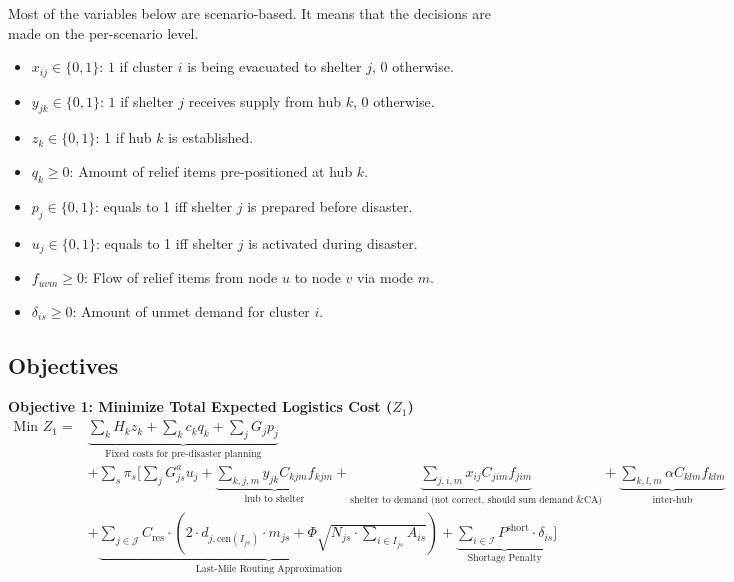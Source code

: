 {Most of the variables below are scenario-based. It means that the decisions are made on the per-scenario level.

\begin{itemize}
    \item $x_{ij} \in \{0,1\}$: $1$ if cluster $i$ is being evacuated to shelter $j$, $0$ otherwise.
    \item $y_{jk} \in \{0,1\}$: $1$ if shelter $j$ receives supply from hub $k$, $0$ otherwise.
    \item $z_k \in \{0,1\}$: 1 if hub $k$ is established.
    \item $q_k \ge 0$: Amount of relief items pre-positioned at hub $k$.
    \item $p_{j} \in \{0,1\}$: equals to 1 iff shelter $j$ is prepared before disaster.
    \item $u_{j} \in \{0,1\}$: equals to 1 iff shelter $j$ is activated during disaster.
    \item $f_{uvm} \ge 0$: Flow of relief items from node $u$ to node $v$ via mode $m$.
    \item $\delta_{is} \ge 0$: Amount of unmet demand for cluster $i$.
\end{itemize}


\subsection*{Objectives}
\textbf{Objective 1: Minimize Total Expected Logistics Cost ($Z_1$)}
\begin{equation} \label{eq:obj1}
\begin{aligned}
    \text{Min } Z_1 = & \underbrace{\sum_{k} H_k z_k + \sum_{k} c_k q_k + \sum_{j}{G_j p_j }}_{\text{Fixed costs for pre-disaster planning}} \\
    & + \sum_{s} \pi_s \Bigg[ \sum_{j}  G^a_{js} u_j 
    + \underbrace{\sum_{k,j,m} y_{jk} C_{kjm} f_{kjm}}_{\text{hub to shelter}}
    + \underbrace{\sum_{j,i,m} x_{ij} C_{jim} f_{jim}}_{\text{shelter to demand (not correct, should sum demand \& CA)}}
    + \underbrace{\sum_{k,l,m} \alpha C_{klm} f_{klm}}_{\text{inter-hub}} \\
    & + \underbrace{\sum_{j \in \mathcal{J}} C_{\text{res}} \cdot \left( 2 \cdot d_{j, \text{cen}(I_{js})} \cdot m_{js} + \Phi \sqrt{N_{js} \cdot \sum_{i \in I_{js}} A_{is}} \right)}_{\text{Last-Mile Routing Approximation}} 
    + \underbrace{\sum_{i \in \mathcal{I}} P^{\text{short}} \cdot \delta_{is}}_{\text{Shortage Penalty}} \Bigg]
\end{aligned}
\end{equation}

}
